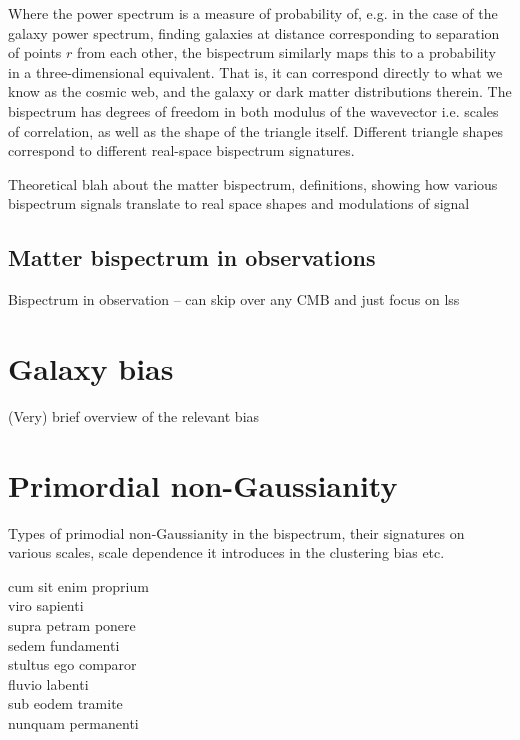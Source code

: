 Where the power spectrum is a measure of probability of, e.g. in the case of the galaxy power spectrum, finding galaxies at distance corresponding to separation of points $r$ from each other, the bispectrum similarly maps this to a probability in a three-dimensional equivalent. That is, it can correspond directly to what we know as the cosmic web, and the galaxy or dark matter distributions therein. The bispectrum has degrees of freedom in both modulus of the wavevector i.e. scales of correlation, as well as the shape of the triangle itself. Different triangle shapes correspond to different real-space bispectrum signatures.

Theoretical blah about the matter bispectrum, definitions, showing how various bispectrum signals translate to real space shapes and modulations of signal

\subsection{Matter bispectrum in observations}

Bispectrum in observation -- can skip over any CMB and just focus on lss

\section{Galaxy bias}


(Very) brief overview of the relevant bias


\section{Primordial non-Gaussianity}

Types of primodial non-Gaussianity in the bispectrum, their signatures on various scales, scale dependence it introduces in the clustering bias etc. 


cum sit enim proprium \\
viro sapienti \\
supra petram ponere \\
sedem fundamenti \\
stultus ego comparor \\
fluvio labenti \\
sub eodem tramite \\
nunquam permanenti 